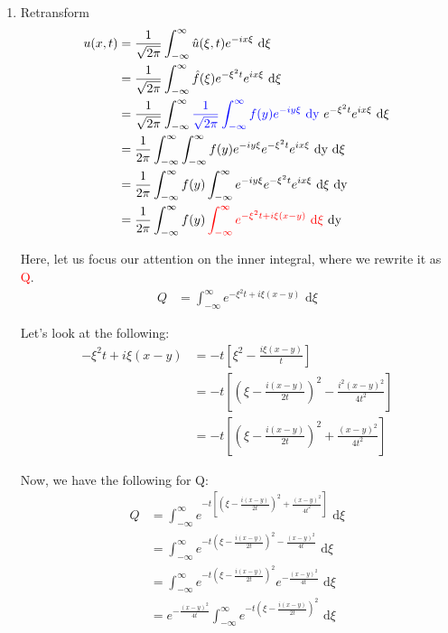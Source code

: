 \begin{enumerate}
  \item Retransform
  \begin{align}
    u(x, t) & = \frac{1}{\sqrt{2 \pi}} \int^\infty_{-\infty} \hat u(\xi, t) e^{-i x \xi} \text{ d}\xi\\
    & = \frac{1}{\sqrt{2 \pi}} \int^\infty_{-\infty} \hat f(\xi) e^{-\xi^2 t}e^{i x \xi} \text{ d}\xi\\
    & = \frac{1}{\sqrt{2 \pi}} \int^\infty_{-\infty}
    \color{blue}{\frac{1}{\sqrt{2 \pi}} \int^\infty_{-\infty} f(y) e^{-i y \xi} \text{ dy}} \ \color{black}
    e^{-\xi^2 t} e^{i x \xi} \text{ d}\xi\\
    & = \frac{1}{2 \pi} \int^\infty_{-\infty} \int^\infty_{-\infty}
    f(y)e^{-i y \xi} e^{-\xi^2 t} e^{i x \xi} \text{ dy d}\xi\\
    & = \frac{1}{2 \pi} \int^\infty_{-\infty} f(y)
    \int^\infty_{-\infty} e^{-i y \xi} e^{-\xi^2 t} e^{i x \xi} \text{ d}\xi \text{ dy}\\
    & = \frac{1}{2 \pi}
    \int^\infty_{-\infty} f(y)
    \color{red}
    \int^\infty_{-\infty} e^{-\xi^2 t + i \xi(x - y)} \text{ d}\xi
    \color{black}
    \text{ dy}
  \end{align}

  Here, let us focus our attention on the inner integral, where we rewrite it as \textcolor{red}{Q}.
  \begin{align}
    Q & = \int^\infty_{-\infty} e^{-\xi^2 t + i\xi(x - y)} \text{ d}\xi
  \end{align}

  Let's look at the following:
  \begin{align}
    -\xi^2 t + i\xi(x - y) & = -t\left[ \xi^2 - \frac{i \xi(x - y)}{t}\right]\\
    & = -t \left[ \left(\xi - \frac{i(x - y)}{2t}\right)^2 - \frac{i^2(x - y)^2}{4t^2} \right]\\
    & = -t \left[ \left(\xi - \frac{i(x - y)}{2t}\right)^2 + \frac{(x - y)^2}{4t^2} \right]
  \end{align}

  Now, we have the following for Q:
  \begin{align}
    Q & = \int^\infty_{-\infty} e^{-t \left[ \left(\xi - \frac{i(x - y)}{2t}\right)^2 + \frac{(x - y)^2}{4t^2} \right]} \text{ d}\xi\\
    & = \int^\infty_{-\infty} e^{-t\left( \xi - \frac{i(x - y)}{2t}\right)^2 - \frac{(x - y)^2}{4t}} \text{ d}\xi\\
    & = \int^\infty_{-\infty} e^{-t \left(\xi - \frac{i(x - y)}{2t}\right)^2} e^{- \frac{(x - y)^2}{4t}} \text{ d}\xi\\
    & = e^{- \frac{(x - y)^2}{4t}} \int^\infty_{-\infty} e^{-t \left(\xi - \frac{i(x - y)}{2t}\right)^2} \text{ d}\xi
  \end{align}


\end{enumerate}
